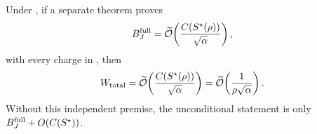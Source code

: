 \begin{corollary}
\label{cor:double-y-composite-product-conditional}
Under , if a separate theorem
proves
\begin{equation}
 B_J^{\rm full}=\widetilde{\mathcal{O}}\!\left(
   \frac{C(S^\star(\rho))}{\sqrt\alpha}
 \right),
 \label{eq:double-y-composite-independent-prefix-bound}
\end{equation}
with every charge in
, then
\begin{equation}
 W_{\rm total}
 =\widetilde{\mathcal{O}}\!\left(
   \frac{C(S^\star(\rho))}{\sqrt\alpha}
 \right)
 =\widetilde{\mathcal{O}}\!\left(\frac1{\rho\sqrt\alpha}\right).
 \label{eq:double-y-composite-conditional-product-work}
\end{equation}
Without this independent premise, the unconditional statement is only
$B_J^{\rm full}+O(C(S^\star))$.
\end{corollary}

